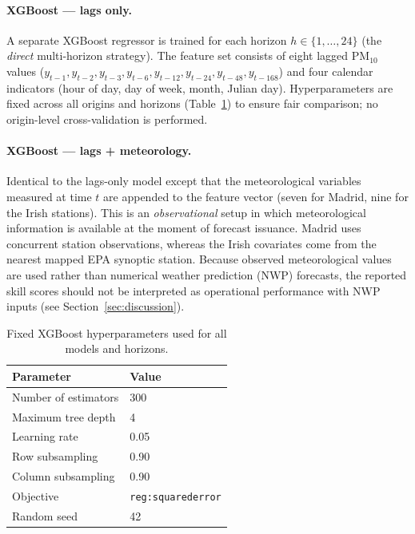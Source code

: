 \documentclass[pdflatex,sn-basic,iicol]{sn-jnl}
\newcommand{\PMten}{\ensuremath{\mathrm{PM}_{10}}}
\begin{document}
\paragraph{XGBoost --- lags only.}
A separate XGBoost regressor \citep{Chen2016} is trained for each horizon
$h \in \{1, \ldots, 24\}$ (the \emph{direct} multi-horizon strategy).  The
feature set consists of eight lagged \PMten{} values
($y_{t-1}, y_{t-2}, y_{t-3}, y_{t-6}, y_{t-12}, y_{t-24}, y_{t-48},
y_{t-168}$) and four calendar indicators (hour of day, day of week, month,
Julian day).  Hyperparameters are fixed across all origins and horizons
(Table~\ref{tab:xgb_params}) to ensure fair comparison; no origin-level
cross-validation is performed.

\paragraph{XGBoost --- lags + meteorology.}
Identical to the lags-only model except that the meteorological variables
measured at time $t$ are appended to the feature vector (seven for Madrid, nine for the Irish stations).  This is an
\emph{observational} setup in which meteorological information is available at
the moment of forecast issuance.  Madrid uses concurrent station observations,
whereas the Irish covariates come from the nearest mapped EPA synoptic station.
Because observed meteorological values are used
rather than numerical weather prediction (NWP) forecasts, the reported skill
scores should not be interpreted as operational performance with NWP inputs (see Section~\ref{sec:discussion}).

\begin{table}[t]
\centering
\small
\caption{Fixed XGBoost hyperparameters used for all models and horizons.}
\label{tab:xgb_params}
\begin{tabular}{ll}
\toprule
Parameter & Value \\
\midrule
Number of estimators & 300 \\
Maximum tree depth & 4 \\
Learning rate & 0.05 \\
Row subsampling & 0.90 \\
Column subsampling & 0.90 \\
Objective & \texttt{reg:squarederror} \\
Random seed & 42 \\
\bottomrule
\end{tabular}
\end{table}
\end{document}
